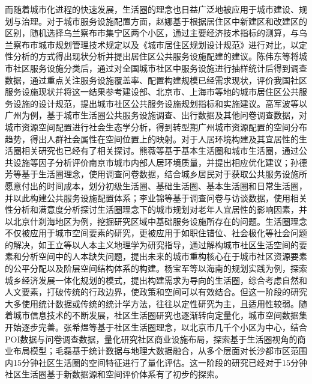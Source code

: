 \documentclass{shnuthesis}
\begin{document}
\indent 而随着城市化进程的快速发展，生活圈的理念也日益广泛地被应用于城市建设、规划与治理。对于城市服务设施配置方面，赵娜基于根据居住区中新建区和改建区的区别，随机选择乌兰察布市集宁区两个小区，通过主要经济技术指标的测算，与乌兰察布市城市规划管理技术规定以及《城市居住区规划设计规范》进行对比，以定性分析的方式得出现状分析并提出居住区公共服务设施配建的建议\textsuperscript{\cite{zhao2014}}。陈伟东等将城市社区服务设施分类后，通过对全国城市社区中服务设施进行抽样统计后得到调查数据，通过重点关注服务设施覆盖率、配置构建规模已经需求现状，评价我国社区服务设施现状并将这一结果参考建设部、北京市、上海市等地的城市居住区公共服务设施的设计规范，提出城市社区公共服务设施规划指标和实施建议\textsuperscript{\cite{chen2007}}。高军波等以广州为例，基于城市生活圈公共服务设施调查、出行数据及其他问卷调查数据，对城市资源空间配置进行社会生态学分析，得到转型期广州城市资源配置的空间分布趋势，得出人群社会属性在空间位置上的映射\textsuperscript{\cite{gao2011}}。对于人居环境构建及其宜居性的生活圈相关研究也已经有了相关探讨。熊薇等基于基本生活圈和城市生活圈，通过公共设施等因子分析评价南京市城市内部人居环境质量，并提出相应优化建议\textsuperscript{\cite{xiong2010}}；孙德芳等基于生活圈理念，使用调查问卷数据，结合城乡居民对于获取公共服务设施所愿意付出的时间成本，划分初级生活圈、基础生活圈、基本生活圈和日常生活圈，并以此构建公共服务设施配置体系\textsuperscript{\cite{sun2012}}；李业锦等基于调查问卷与访谈数据，使用相关性分析和满意度分析探讨生活圈理念下的城市规划对老年人宜居性的影响因素，并以北京什刹海地区为例，挖掘研究区域中基础服务设施所存在的问题\textsuperscript{\cite{李业锦2012}}。生活圈理念不仅被应用于城市空间要素的研究，更被应用于如职住错位、社会极化等社会问题的解决，如王立等以人本主义地理学为研究指导，通过解构城市社区生活空间的要素和分析空间中的人本缺失问题，提出未来的城市重构核心在于城市社区资源要素的公平分配以及阶层空间结构体系的构建\textsuperscript{\cite{wang2011}}。杨宝军等以海南的规划实践为例，探索城乡经济发展一体化规划的模式，提出构建需求为导向的生活圈，综合考虑自然和人文要素，打破传统的行政边界，使政策和空间可以有效结合\textsuperscript{\cite{yang2012}}。但这一阶段的研究大多使用统计数据或传统的统计学方法，往往以定性研究为主，且适用性较弱。随着城市信息技术的不断发展，社区生活圈研究也逐渐转向定量化，城市空间数据集开始逐步完善。张希煜等基于社区生活圈理念，以北京市几千个小区为中心，结合POI数据与问卷调查数据，量化研究社区商业设施布局，探索基于生活圈视角的商业布局模型\textsuperscript{\cite{zhang2018}}；毛磊基于统计数据与地理大数据融合，从多个层面对长沙都市区范围内15分钟社区生活圈的空间特征进行了量化评估\textsuperscript{\cite{mao2019a}}。这一阶段的研究已经对于15分钟社区生活圈基于新数据源和空间评价体系有了初步的探索。\\
\end{document}
